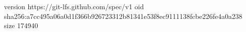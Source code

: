 version https://git-lfs.github.com/spec/v1
oid sha256:a7cc495a06a0d1f366b926723312b81341e53f8ec9111138fcbe226fe4a0a238
size 174940
